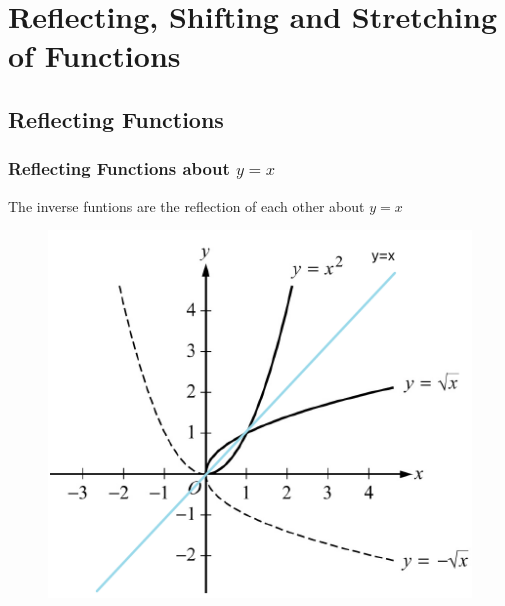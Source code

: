 \documentclass[
	11pt, %
]{beamer}
\begin{document}
\section{Reflecting, Shifting and Stretching of Functions}

\subsection{Reflecting Functions}
\begin{frame}
	\frametitle{Reflecting Functions about $y = x$}
	\begin{theorem}[关于$y=x$镜像对称：调换xy]
	The inverse funtions are the reflection of each other about $y = x$
	\end{theorem}

	\begin{figure}
		\includegraphics[width=0.5\linewidth]{Reflection1.png} 
	\end{figure}
\end{frame}

\end{document}
